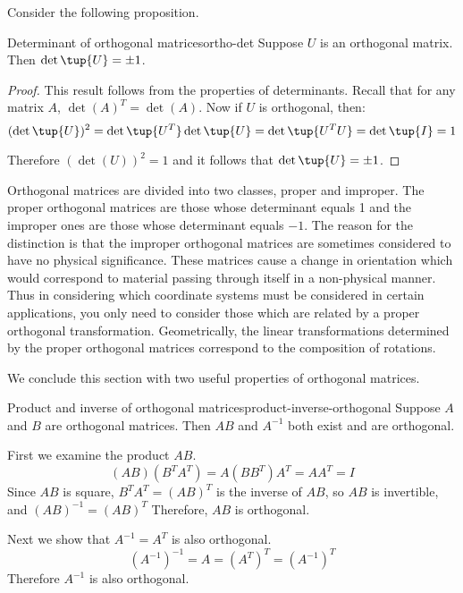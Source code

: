 Consider the following proposition.

\begin{proposition}{Determinant of orthogonal matrices}{ortho-det}
Suppose $U$ is an orthogonal matrix. Then $\det \tup{U} = \pm 1$. 
\end{proposition}

\begin{proof}
This result follows from the properties of determinants. Recall that
for any matrix $A$, $\det(A)^T = \det(A)$. Now if $U$ is orthogonal, then:
\begin{equation*}
(\det \tup{U}) ^{2}=\det \tup{U^{T}} \det \tup{U}
=\det \tup{U^{T}U} =\det \tup{I} =1
\end{equation*}

Therefore $(\det (U))^2 = 1$ and it follows that $\det \tup{U} = \pm 1$. 
\end{proof}

Orthogonal matrices are divided into two classes, proper and improper.
The proper orthogonal matrices are those whose determinant equals 1
and the improper ones are those whose determinant equals $-1$. The
reason for the distinction is that the improper orthogonal matrices
are sometimes considered to have no physical significance. These
matrices cause a change in orientation which would correspond to
material passing through itself in a non-physical manner. Thus in
considering which coordinate systems must be considered in certain
applications, you only need to consider those which are related by a
proper orthogonal transformation. Geometrically, the linear
transformations determined by the proper orthogonal matrices
correspond to the composition of rotations.

We conclude this section with two useful properties of orthogonal matrices. 

\begin{example}{Product and inverse of orthogonal matrices}{product-inverse-orthogonal}
Suppose $A$ and $B$ are orthogonal matrices. Then $AB$ and $A^{-1}$ both exist and are orthogonal.
\end{example}

\begin{solution}
First we examine the product $AB$. 
\[ (AB)(B^TA^T)=A(BB^T)A^T =AA^T=I \]
Since $AB$ is square, $B^TA^T=(AB)^T$ is the inverse of
$AB$, so $AB$ is invertible, and $(AB)^{-1}=(AB)^T$
Therefore, $AB$ is orthogonal.

Next we show that $A^{-1}=A^T$ is also orthogonal. 
\[ (A^{-1})^{-1} = A = (A^T)^{T}
=(A^{-1})^{T} \]
Therefore $A^{-1}$ is also orthogonal.
\end{solution}
